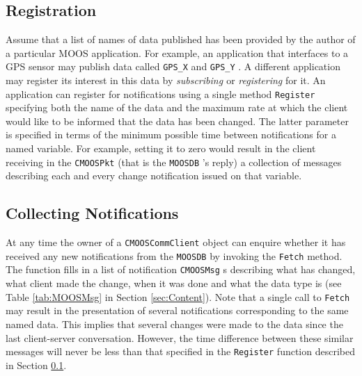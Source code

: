 \documentclass[a4paper,10pt]{article}
\newcommand{\Code}[1]{\texttt{#1} }
\newcommand{\code}[1]{\Code{#1} }
\newcommand{\DB}   {\code{{MOOSDB}}}
\begin{document}
\subsection{Registration}\label{sec:Registration} Assume that a
list of names of data published has been provided by the author of
a particular MOOS application. For example, an application that
interfaces to a GPS sensor may publish data called \code{GPS\_X}
and \code{GPS\_Y}. A different application may register its
interest in this data by {\it{subscribing }} or {\it{registering}}
for it. An application can register for  notifications using a
single method \code{Register} specifying both the name of the data
and the maximum rate at which the client would like to be informed
that the data has been changed. The latter parameter is specified
in terms of the minimum possible time between notifications for a
named variable. For example, setting it to zero would result in the
client receiving in the \code{CMOOSPkt} (that is the \DB's reply)
a collection of messages describing each and every change
notification issued on that variable.

\subsection{Collecting Notifications}\label{sec:CollectingNotifications}
At any time the owner of a \code{CMOOSCommClient} object can
enquire whether it has received any new notifications from the \DB
by invoking the \code{Fetch} method. The function fills in a list
of notification \code{CMOOSMsg}s describing what has changed, what
client made the change, when it was done and what the data type is
(see Table \ref{tab:MOOSMsg} in Section \ref{sec:Content}). Note
that a single call to \code{Fetch} may result in the presentation of several notifications corresponding to the same named data.
This implies that several changes were made to the data since the
last client-server conversation. However, the time difference
between these similar messages will never be less than that
specified in the \code{Register} function described in Section
\ref{sec:Registration}.
\end{document}
